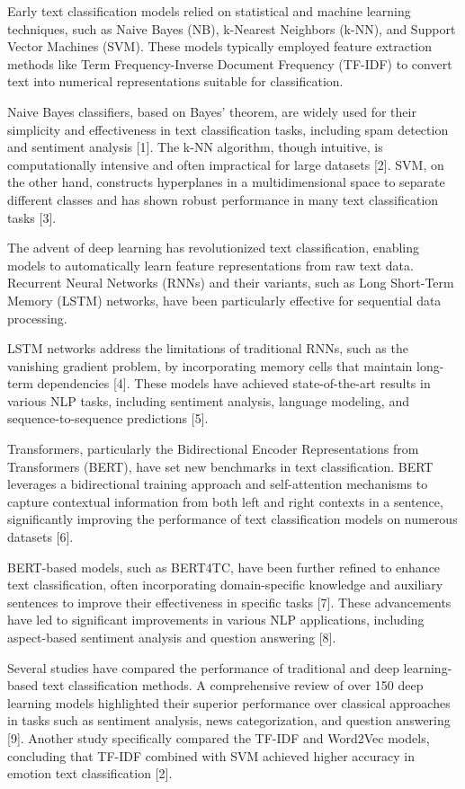 \documentclass[conference]{IEEEtran}
\begin{document}
Early text classification models relied on statistical and machine learning techniques, such as Naive Bayes (NB), k-Nearest Neighbors (k-NN), and Support Vector Machines (SVM). These models typically employed feature extraction methods like Term Frequency-Inverse Document Frequency (TF-IDF) to convert text into numerical representations suitable for classification.

Naive Bayes classifiers, based on Bayes' theorem, are widely used for their simplicity and effectiveness in text classification tasks, including spam detection and sentiment analysis [1]. The k-NN algorithm, though intuitive, is computationally intensive and often impractical for large datasets [2]. SVM, on the other hand, constructs hyperplanes in a multidimensional space to separate different classes and has shown robust performance in many text classification tasks [3].

The advent of deep learning has revolutionized text classification, enabling models to automatically learn feature representations from raw text data. Recurrent Neural Networks (RNNs) and their variants, such as Long Short-Term Memory (LSTM) networks, have been particularly effective for sequential data processing.

LSTM networks address the limitations of traditional RNNs, such as the vanishing gradient problem, by incorporating memory cells that maintain long-term dependencies [4]. These models have achieved state-of-the-art results in various NLP tasks, including sentiment analysis, language modeling, and sequence-to-sequence predictions [5].

Transformers, particularly the Bidirectional Encoder Representations from Transformers (BERT), have set new benchmarks in text classification. BERT leverages a bidirectional training approach and self-attention mechanisms to capture contextual information from both left and right contexts in a sentence, significantly improving the performance of text classification models on numerous datasets [6].

BERT-based models, such as BERT4TC, have been further refined to enhance text classification, often incorporating domain-specific knowledge and auxiliary sentences to improve their effectiveness in specific tasks [7]. These advancements have led to significant improvements in various NLP applications, including aspect-based sentiment analysis and question answering [8].

Several studies have compared the performance of traditional and deep learning-based text classification methods. A comprehensive review of over 150 deep learning models highlighted their superior performance over classical approaches in tasks such as sentiment analysis, news categorization, and question answering [9]. Another study specifically compared the TF-IDF and Word2Vec models, concluding that TF-IDF combined with SVM achieved higher accuracy in emotion text classification [2].
\end{document}
